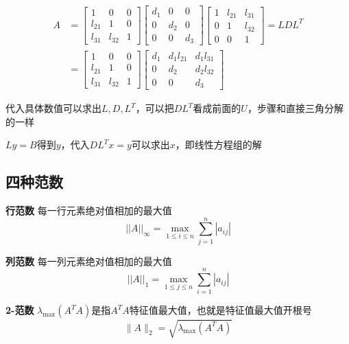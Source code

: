 \[
\begin{aligned}
    A
    &= 
    \left[
    \begin{array}{ccc}
        1 & 0 & 0 \\
        l_{21} & 1 & 0 \\
        l_{31} & l_{32} & 1
    \end{array}
    \right]
    \left[
    \begin{array}{ccc}
        d_{1} & 0 & 0 \\
        0 & d_{2} &0 \\
        0 & 0 & d_{3}
    \end{array}
    \right]
    \left[
    \begin{array}{ccc}
        1 & l_{21} & l_{31} \\
        0 & 1 & l_{32} \\
        0 & 0 & 1
    \end{array}
    \right] 
    =LDL^T \\
    &=
    \left[
    \begin{array}{ccc}
        1 & 0 & 0 \\
        l_{21} & 1 & 0 \\
        l_{31} & l_{32} & 1
    \end{array}
    \right]
    \left[
    \begin{array}{ccc}
        d_{1} & d_{1}l_{21} & d_{1}l_{31} \\
        0 & d_{2} & d_{2}l_{32} \\
        0 & 0 & d_{3}
    \end{array}
    \right]
\end{aligned}
\]

代入具体数值可以求出$L,D,L^T$，可以把$DL^T$看成前面的$U$，步骤和直接三角分解的一样

$Ly=B$得到$y$，代入$DL^Tx=y$可以求出$x$，即线性方程组的解

\subsection{四种范数}

\textbf{行范数} \quad 每一行元素绝对值相加的最大值
    \[
    ||A||_{\infty}=\max_{1 \leq i \leq n} \sum_{j=1}^{n} |a_{ij}|
    \]

    
\textbf{列范数} \quad 每一列元素绝对值相加的最大值
    \[
    ||A||_{1}=\max_{1 \leq j \leq n} \sum_{i=1}^{n} |a_{ij}|
    \]

\textbf{2-范数} \quad $\lambda_{\max}(A^T A)$是指$A^T A$特征值最大值，也就是特征值最大值开根号
    \[
    \|A\|_2 = \sqrt{\lambda_{\max}(A^T A)}
    \]

